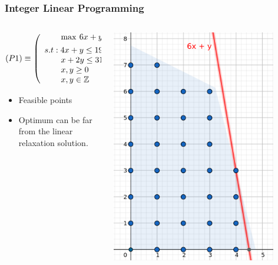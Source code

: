 \documentclass{beamer}
\begin{document}
        \begin{frame}
        \frametitle{Integer Linear Programming}
        
        \begin{columns}[T] %
        \begin{column}{.48\textwidth}
        \begin{equation*}
            (P1) \equiv 	\left( \begin{array}{l}
	                        \qquad \max \hspace{2pt}  6x + y  \vspace{4pt} \\ 
	                        s.t: 4x + y \leq 19 \\
	                        \qquad x + 2y \leq 31 \\
	                        \qquad x,y\geq 0 \\
	                        \qquad x,y \in \mathbb{Z}
	                        \end{array} \right)
        \end{equation*}
        \begin{itemize}
            \item Feasible points
            \item Optimum can be far from the linear relaxation solution.
        \end{itemize}
        \end{column}%
        \hfill%
        \begin{column}{.48\textwidth}
            \includegraphics[width=0.85\textwidth]{images/IP(2).png}
        \end{column}%
        \end{columns}
        

\end{frame}
\end{document}
